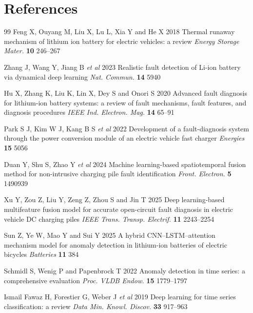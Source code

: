 \documentclass{iopjournal}
\begin{document}
\section*{References}
\begingroup
\renewcommand{\section}[2]{}
\begin{thebibliography}{99}
\footnotesize
\setlength{\itemsep}{1pt}
 Feng X, Ouyang M, Liu X, Lu L, Xia Y and He X 2018 Thermal runaway mechanism of lithium ion battery for electric vehicles: a review \textit{Energy Storage Mater.} \textbf{10} 246--267

 Zhang J, Wang Y, Jiang B \textit{et al} 2023 Realistic fault detection of Li-ion battery via dynamical deep learning \textit{Nat. Commun.} \textbf{14} 5940

 Hu X, Zhang K, Liu K, Lin X, Dey S and Onori S 2020 Advanced fault diagnosis for lithium-ion battery systems: a review of fault mechanisms, fault features, and diagnosis procedures \textit{IEEE Ind. Electron. Mag.} \textbf{14} 65--91

 Park S J, Kim W J, Kang B S \textit{et al} 2022 Development of a fault-diagnosis system through the power conversion module of an electric vehicle fast charger \textit{Energies} \textbf{15} 5056

 Duan Y, Shu S, Zhao Y \textit{et al} 2024 Machine learning-based spatiotemporal fusion method for non-intrusive charging pile fault identification \textit{Front. Electron.} \textbf{5} 1490939

 Xu Y, Zou Z, Liu Y, Zeng Z, Zhou S and Jin T 2025 Deep learning-based multifeature fusion model for accurate open-circuit fault diagnosis in electric vehicle DC charging piles \textit{IEEE Trans. Transp. Electrif.} \textbf{11} 2243--2254

 Sun Z, Ye W, Mao Y and Sui Y 2025 A hybrid CNN--LSTM--attention mechanism model for anomaly detection in lithium-ion batteries of electric bicycles \textit{Batteries} \textbf{11} 384

 Schmidl S, Wenig P and Papenbrock T 2022 Anomaly detection in time series: a comprehensive evaluation \textit{Proc. VLDB Endow.} \textbf{15} 1779--1797

 Ismail Fawaz H, Forestier G, Weber J \textit{et al} 2019 Deep learning for time series classification: a review \textit{Data Min. Knowl. Discov.} \textbf{33} 917--963


\end{thebibliography}
\end{document}
